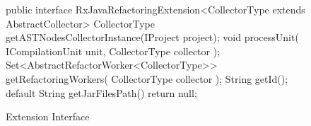 \begin{figure}[H]
\begin{sourcecode}
\begin{javacode}{}
public interface RxJavaRefactoringExtension<CollectorType extends AbstractCollector> {
	CollectorType getASTNodesCollectorInstance(IProject project);
	void processUnit( ICompilationUnit unit, CollectorType collector );
	Set<AbstractRefactorWorker<CollectorType>> getRefactoringWorkers( CollectorType collector );
	String getId();
	default String getJarFilesPath() { return null;}
}
\end{javacode}
\caption{Extension Interface}
\label{code:extension-interface}
\end{sourcecode}
\end{figure}